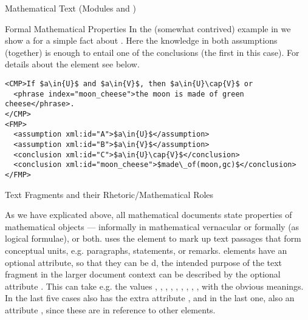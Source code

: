 \begin{tchapter}[id=mtxt,short=Mathematical Text]{Mathematical Text (Modules
  {} and {})}
\begin{tsection}[id=FMP]{Formal Mathematical Properties}
  In the (somewhat contrived) example in {} we show a
  {} for a simple fact about {}. Here the
  knowledge in both assumptions (together) is enough to entail one of the conclusions (the
  first in this case). For details about the {} element see
  {} below.

\begin{lstlisting}[mathescape,label=lst:sequent,
  caption={Representing Vernacular as an {\element{FMP}} Sequent},
  index={trl,xml:lang,CMP,FMP,OMOBJ}]
<CMP>If $a\in{U}$ and $a\in{V}$, then $a\in{U}\cap{V}$ or 
  <phrase index="moon_cheese">the moon is made of green cheese</phrase>.
</CMP>
<FMP>
  <assumption xml:id="A">$a\in{U}$</assumption>
  <assumption xml:id="B">$a\in{V}$</assumption>
  <conclusion xml:id="C">$a\in{U}\cap{V}$</conclusion>
  <conclusion xml:id="moon_cheese">$made\_of(moon,gc)$</conclusion>
</FMP>
\end{lstlisting}
\end{tsection}

\begin{tsection}[id=omtext]{Text Fragments and their Rhetoric/Mathematical Roles}

  As we have explicated above, all mathematical documents state properties of mathematical
  objects --- informally in mathematical vernacular or formally (as logical formulae), or
  both. {\omdoc} uses the {} element to mark up text passages that form
  conceptual units, e.g. paragraphs, statements, or remarks.  {} elements
  have an optional {} attribute, so that they can be
  {d}, the intended purpose of the text fragment in the larger
  document context can be described by the optional attribute {}.
  This can take e.g. the values {},
  {}, {},
  {}, {},
  {}, {},
  {}, {},
  {} with the obvious meanings. In the last five cases
  {} also has the extra attribute {}, and in the
  last one, also an attribute {}, since these are in reference to
  other {\omdoc} elements.


\end{tsection}
\end{tchapter}
